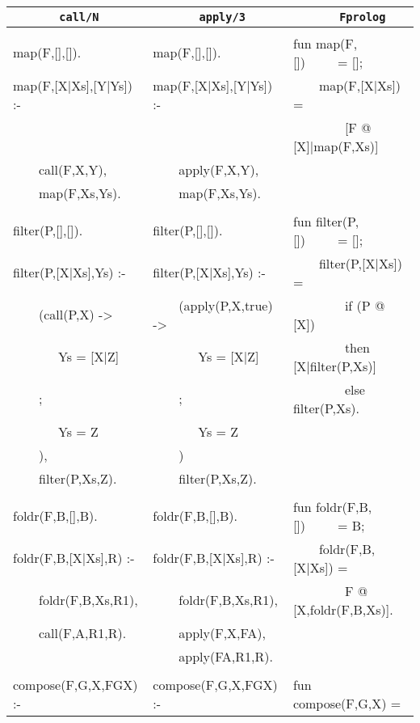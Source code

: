 \documentclass[a4paper,11pt,twoside]{article}
\begin{document}
\begin{table}[htb]
{\footnotesize
\tt
\begin{tabular}{| l | l | l |}
\hline
\texttt{~~~~~~~call/N}     & \texttt{~~~~~~~apply/3}   &\texttt{~~~~~~~Fprolog}\\
\hline
& & \\
map(F,[],[]).              &map(F,[],[]).              &fun map(F,[])~~~~~= [];\\
map(F,[X|Xs],[Y|Ys]) :-    &map(F,[X|Xs],[Y|Ys]) :-    &~~~~map(F,[X|Xs]) = \\
                           &                           &~~~~~~~~[F @ [X]|map(F,Xs)]\\
~~~~call(F,X,Y),           &~~~~apply(F,X,Y),          &\\
~~~~map(F,Xs,Ys).          &~~~~map(F,Xs,Ys).          &\\
& & \\
filter(P,[],[]).           &filter(P,[],[]).           &fun filter(P,[])~~~~~= [];\\
filter(P,[X|Xs],Ys) :-     &filter(P,[X|Xs],Ys) :-     &~~~~filter(P,[X|Xs]) =\\ 
~~~~(call(P,X) ->          &~~~~(apply(P,X,true) ->    &~~~~~~~~if (P @ [X])\\
~~~~~~~Ys = [X|Z]          &~~~~~~~Ys = [X|Z]          &~~~~~~~~then [X|filter(P,Xs)]\\
~~~~;                      &~~~~;                      &~~~~~~~~else filter(P,Xs).\\
~~~~~~~Ys = Z              &~~~~~~~Ys = Z              & \\
~~~~),                     &~~~~)                      & \\
~~~~filter(P,Xs,Z).        &~~~~filter(P,Xs,Z).        & \\
& & \\
foldr(F,B,[],B).           &foldr(F,B,[],B).           &fun foldr(F,B,[])~~~~~= B; \\
foldr(F,B,[X|Xs],R) :-     &foldr(F,B,[X|Xs],R) :-     &~~~~foldr(F,B,[X|Xs]) =\\
~~~~foldr(F,B,Xs,R1),      &~~~~foldr(F,B,Xs,R1),      &~~~~~~~~F @ [X,foldr(F,B,Xs)].\\
~~~~call(F,A,R1,R).        &~~~~apply(F,X,FA),         & \\
                           &~~~~apply(FA,R1,R).        & \\
& & \\
compose(F,G,X,FGX) :-      &compose(F,G,X,FGX) :-      &fun compose(F,G,X) =\\

\end{tabular}}
\end{table}
\end{document}
